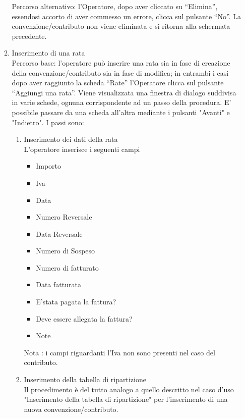 \begin{enumerate}
\begin{enumerate}
  Percorso alternativo:
  l'Operatore, dopo aver cliccato su ``Elimina'', essendosi accorto di aver commesso un errore, clicca sul pulsante ``No''. La convenzione/contributo non viene eliminata e si ritorna alla schermata precedente.
  
  
  
\item Inserimento di una rata\\ \label{UC_new_installment}
Percorso base:
l'operatore può inserire una rata sia in fase di creazione della convenzione/contributo sia in fase di modifica; in entrambi i casi dopo aver raggiunto
la scheda ``Rate'' l'Operatore clicca sul pulsante ``Aggiungi una rata''.  
Viene visualizzata una finestra di dialogo suddivisa in varie schede,
ognuna corrispondente ad un passo della procedura. E' possibile passare da una scheda all'altra mediante i pulsanti "Avanti" e "Indietro". I passi sono:
\begin{enumerate}
  \item Inserimento dei dati della rata\\
  
  L'operatore inserisce i seguenti campi
    \begin{itemize}
    \item Importo
    \item Iva
    \item Data
    \item Numero Reversale
    \item Data Reversale
    \item Numero di Sospeso
    \item Numero di fatturato
    \item Data fatturata
    \item E'stata pagata la fattura?
    \item Deve essere allegata la fattura?
    \item Note
    \end{itemize}
    
   Nota : i campi riguardanti l'Iva non sono presenti nel caso del contributo.

   
  \item Inserimento della tabella di ripartizione\\
  
  Il procedimento è del tutto analogo  a quello descritto nel caso d'uso "Inserimento della tabella di ripartizione" per l'inserimento di 
  una nuova convenzione/contributo. 
\end{enumerate}


\end{enumerate}
\end{enumerate}
